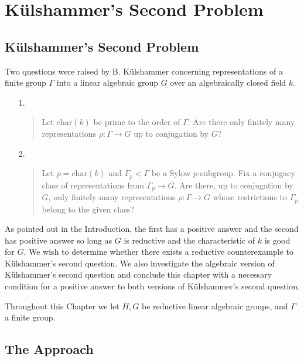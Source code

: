
\chapter{K\"ulshammer's Second Problem}
\label{Chapter4}

\section{K\"ulshammer's Second Problem}

Two questions were raised by B. K\"ulshammer concerning representations of a finite group $\Gamma$ into a linear algebraic group $G$ over an algebraically closed field $k$. 
\begin{itemize}
  \item[1.] \begin{quote} Let $\mathrm{char}(k)$ be prime to the order of $\Gamma$. Are there only finitely many representations $\rho:\Gamma\rightarrow G$ up to conjugation by $G$?
    \end{quote}
  \item[2.] \begin{quote} Let $p = \mathrm{char}(k)$ and $\Gamma_p < \Gamma$ be a Sylow $p$-subgroup. Fix a conjugacy class of representations from $\Gamma_p\rightarrow G$. Are there, up to conjugation by $G$, only finitely many representations $\rho:\Gamma\rightarrow G$ whose restrictions to $\Gamma_p$ belong to the given class?
    \end{quote}
\end{itemize}

As pointed out in the Introduction, the first has a positive answer and the second has positive answer so long as $G$ is reductive and the characteristic of $k$ is good for $G$. We wish to determine whether there exists a reductive counterexample to K\"ulshammer's second question. We also investigate the algebraic version of K\"ulshammer's second question and conclude this chapter with a necessary condition for a positive answer to both versions of K\"ulshammer's second question.

Throughout this Chapter we let $H,G$ be reductive linear algebraic groups, and $\Gamma$ a finite group.

\section{The Approach}

